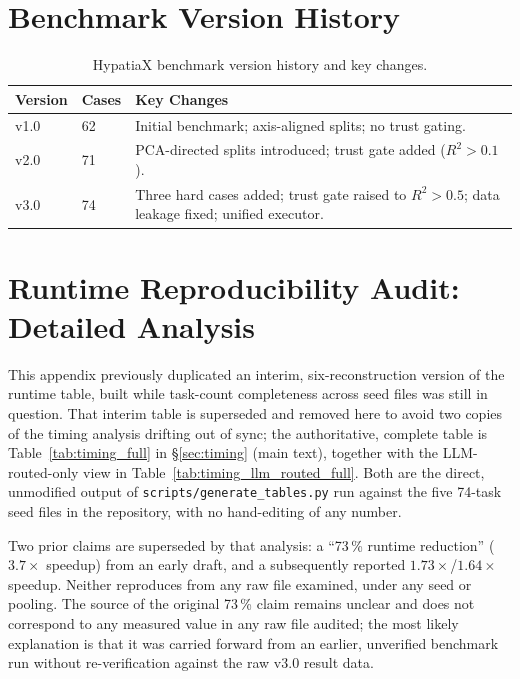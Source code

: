 \documentclass[twoside,11pt]{article}
\newcommand{\Rsq}{R^{2}}
\begin{document}
\section{Benchmark Version History}\label{sec:version_history}
\label{app:versions}

\begin{table}[h]
\centering
\caption{HypatiaX benchmark version history and key changes.}
\begin{tabular}{llp{8cm}}
\toprule
Version & Cases & Key Changes \\
\midrule
v1.0 & 62 & Initial benchmark; axis-aligned splits; no trust gating. \\
v2.0 & 71 & PCA-directed splits introduced; trust gate added ($\Rsq > 0.1$). \\
v3.0 & 74 & Three hard cases added; trust gate raised to $\Rsq > 0.5$; data leakage fixed; unified executor. \\
\bottomrule
\end{tabular}
\end{table}

\section{Runtime Reproducibility Audit: Detailed Analysis}\label{sec:runtime_correction}
\label{app:timing}

This appendix previously duplicated an interim, six-reconstruction version
of the runtime table, built while task-count completeness across seed
files was still in question. That interim table is superseded and
removed here to avoid two copies of the timing analysis drifting out of
sync; the authoritative, complete table is
Table~\ref{tab:timing_full} in \S\ref{sec:timing} (main text), together
with the LLM-routed-only view in Table~\ref{tab:timing_llm_routed_full}.
Both are the direct, unmodified output of \texttt{scripts/generate\_tables.py}
run against the five 74-task seed files in the repository, with no hand-editing
of any number.

Two prior claims are superseded by that analysis: a ``73\,\% runtime
reduction'' ($3.7\times$ speedup) from an early draft, and a subsequently
reported $1.73\times$/$1.64\times$ speedup. Neither reproduces from any
raw file examined, under any seed or pooling. The source of the original
73\,\% claim remains unclear and does not correspond to any measured
value in any raw file audited; the most likely explanation is that it was
carried forward from an earlier, unverified benchmark run without
re-verification against the raw v3.0 result data.
\end{document}
